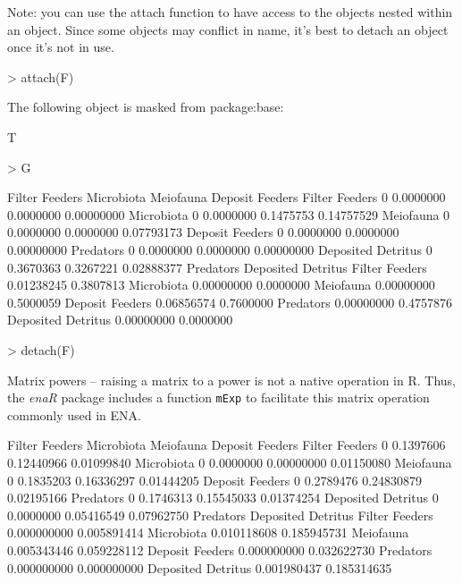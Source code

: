 \documentclass[11pt]{article}
\begin{document}
Note: you can use the attach function to have access to the objects
nested within an object. Since some objects may conflict in name, it's
best to detach an object once it's not in use.

\begin{Schunk}
\begin{Sinput}
> attach(F)
\end{Sinput}
\begin{Soutput}
The following object is masked from package:base:

    T
\end{Soutput}
\begin{Sinput}
> G
\end{Sinput}
\begin{Soutput}
                   Filter Feeders Microbiota Meiofauna Deposit Feeders
Filter Feeders                  0  0.0000000 0.0000000      0.00000000
Microbiota                      0  0.0000000 0.1475753      0.14757529
Meiofauna                       0  0.0000000 0.0000000      0.07793173
Deposit Feeders                 0  0.0000000 0.0000000      0.00000000
Predators                       0  0.0000000 0.0000000      0.00000000
Deposited Detritus              0  0.3670363 0.3267221      0.02888377
                    Predators Deposited Detritus
Filter Feeders     0.01238245          0.3807813
Microbiota         0.00000000          0.0000000
Meiofauna          0.00000000          0.5000059
Deposit Feeders    0.06856574          0.7600000
Predators          0.00000000          0.4757876
Deposited Detritus 0.00000000          0.0000000
\end{Soutput}
\begin{Sinput}
> detach(F) 
\end{Sinput}
\end{Schunk}

Matrix powers -- raising a matrix to a power is not a native operation
in R.  Thus, the \textit{enaR} package includes a function
\texttt{mExp} to facilitate this matrix operation commonly used in ENA.

\begin{Schunk}
\begin{Soutput}
                   Filter Feeders Microbiota  Meiofauna Deposit Feeders
Filter Feeders                  0  0.1397606 0.12440966      0.01099840
Microbiota                      0  0.0000000 0.00000000      0.01150080
Meiofauna                       0  0.1835203 0.16336297      0.01444205
Deposit Feeders                 0  0.2789476 0.24830879      0.02195166
Predators                       0  0.1746313 0.15545033      0.01374254
Deposited Detritus              0  0.0000000 0.05416549      0.07962750
                     Predators Deposited Detritus
Filter Feeders     0.000000000        0.005891414
Microbiota         0.010118608        0.185945731
Meiofauna          0.005343446        0.059228112
Deposit Feeders    0.000000000        0.032622730
Predators          0.000000000        0.000000000
Deposited Detritus 0.001980437        0.185314635
\end{Soutput}
\end{Schunk}
\end{document}
